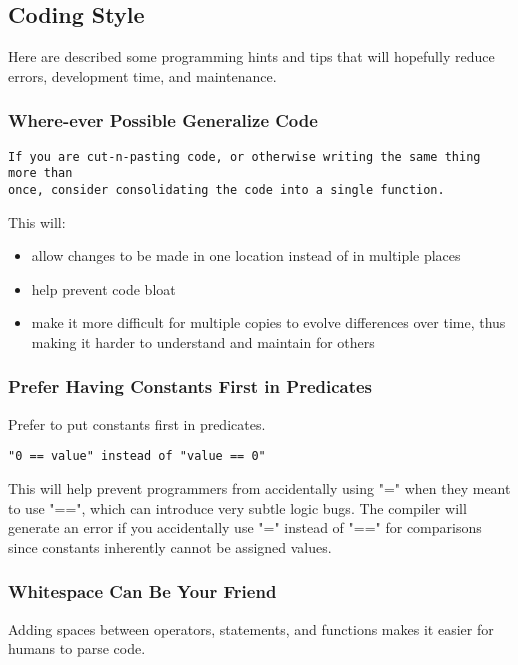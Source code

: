 \hypertarget{toc22}{}
\subsection{Coding Style}
Here are described some programming hints and tips that will hopefully reduce
errors, development time, and maintenance.

\hypertarget{toc23}{}
\subsubsection{Where-ever Possible Generalize Code}
\begin{verbatim}
If you are cut-n-pasting code, or otherwise writing the same thing more than
once, consider consolidating the code into a single function.
\end{verbatim}

This will:

\begin{itemize}
\item allow changes to be made in one location instead of in multiple places
\item help prevent code bloat
\item make it more difficult for multiple copies to evolve differences over time,
    thus making it harder to understand and maintain for others
\end{itemize}

\hypertarget{toc24}{}
\subsubsection{Prefer Having Constants First in Predicates}
Prefer to put constants first in predicates. 

\begin{verbatim}
"0 == value" instead of "value == 0"
\end{verbatim}

This will help prevent programmers from accidentally using "=" when they meant
to use "==", which can introduce very subtle logic bugs.  The compiler will
generate an error if you accidentally use "=" instead of "==" for comparisons
since constants inherently cannot be assigned values.

\hypertarget{toc25}{}
\subsubsection{Whitespace Can Be Your Friend}
Adding spaces between operators, statements, and functions makes it easier for
humans to parse code.

